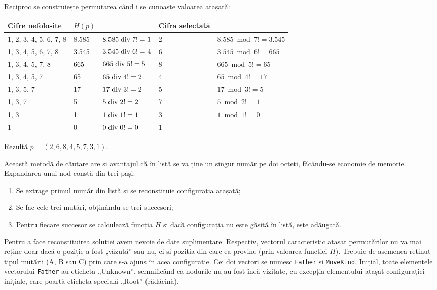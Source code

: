 Reciproc se construiește permutarea când i se cunoaște valoarea atașată:

\begin{table}[H]
  \centering
  \small
  \begin{tabular}{|l|l|l|l|l|}
    \hline
    Cifre nefolosite       & $H(p)$ &                      & Cifra selectată & \\ \hline
    1, 2, 3, 4, 5, 6, 7, 8 & 8.585  & $8.585 \bdiv 7! = 1$ & 2 & $8.585 \bmod 7! = 3.545$ \\
    1, 3, 4, 5, 6, 7, 8    & 3.545  & $3.545 \bdiv 6! = 4$ & 6 & $3.545 \bmod 6! = 665$ \\
    1, 3, 4, 5, 7, 8       & 665    & $665 \bdiv 5! = 5$   & 8 & $665 \bmod 5! = 65$ \\
    1, 3, 4, 5, 7          & 65     & $65 \bdiv 4! = 2$    & 4 & $65 \bmod 4! = 17$ \\
    1, 3, 5, 7             & 17     & $17 \bdiv 3! = 2$    & 5 & $17 \bmod 3! = 5$ \\
    1, 3, 7                & 5      & $5 \bdiv 2! = 2$     & 7 & $5 \bmod 2! = 1$ \\
    1, 3                   & 1      & $1 \bdiv 1! = 1$     & 3 & $1 \bmod 1! = 0$ \\
    1                      & 0      & $0 \bdiv 0! = 0$     & 1 & \\ \hline
  \end{tabular}
\end{table}

Rezultă $p = (2, 6, 8, 4, 5, 7, 3, 1)$.

Această metodă de căutare are și avantajul că în listă se va ține un singur
număr pe doi octeți, făcându-se economie de memorie. Expandarea unui nod
constă din trei pași:

\begin{enumerate}

\item Se extrage primul număr din listă și se reconstituie configurația
  atașată;

\item Se fac cele trei mutări, obținându-se trei succesori;

\item Pentru fiecare succesor se calculează funcția $H$ și dacă configurația
  nu este găsită în listă, este adăugată.

\end{enumerate}

Pentru a face reconstituirea soluției avem nevoie de date
suplimentare. Respectiv, vectorul caracteristic atașat permutărilor nu va mai
reține doar dacă o poziție a fost „văzută” sau nu, ci și poziția din care ea
provine (prin valoarea funcției $H$). Trebuie de asemenea reținut tipul
mutării (A, B sau C) prin care s-a ajuns în acea configurație. Cei doi vectori
se numesc {\tt Father} și {\tt MoveKind}. Inițial, toate elementele vectorului
{\tt Father} au eticheta „Unknown”, semnificând că nodurile nu au fost încă
vizitate, cu excepția elementului atașat configurației inițiale, care poartă
eticheta specială „Root” (rădăcină).


